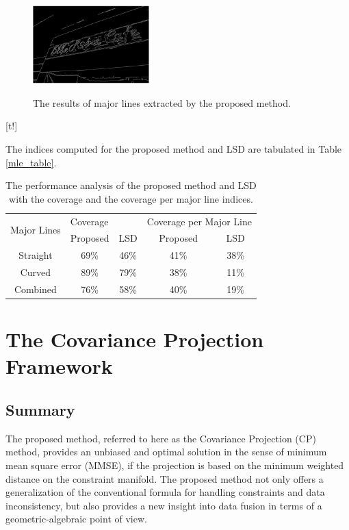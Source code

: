 \documentclass{ieeeaccess}
\begin{document}

\begin{figure}[t!]
\centering
\includegraphics[width=0.4\textwidth]{mle_result_a.png}
\label{mle_result_a}
\caption{The results of major lines extracted by the proposed
method.}
\end{figure}[t!]

The indices computed for
the proposed method and LSD are tabulated in Table \ref{mle_table}. 

\begin{table}
\caption{The performance analysis of the proposed method and LSD with
the coverage and the coverage per major line indices.}

\label{mle_table}
\setlength{\tabcolsep}{3pt}
\centering
\begin{tabular}{|c|c|c|c|c|}
\hline
\multirow{2}{*}{Major Lines} & \multicolumn{2}{l|}{Coverage} & \multicolumn{2}{l|}{Coverage per Major Line} \\ \cline{2-5} 
                             & Proposed         & LSD        & Proposed                & LSD                \\ \hline
Straight                     &   69\%               &     46\%       &          41\%               &                   38\% \\ \hline
Curved                      &     89\%         &     79\%     &         38\%            &           11\% \\ \hline
Combined                      &    76\%       &     58\%     &      40\%             &               19\% \\ \hline
\end{tabular}
\label{tab1}
\end{table}

\section{The Covariance Projection Framework}
\subsection{Summary}
The proposed method\cite{cpf}, referred to here as the Covariance Projection (CP) method, provides an
unbiased and optimal solution in the sense of minimum mean square error (MMSE), if the projection
is based on the minimum weighted distance on the constraint manifold. The proposed method
not only offers a generalization of the conventional formula for handling constraints and data
inconsistency, but also provides a new insight into data fusion in terms of a geometric-algebraic
point of view.
\end{document}
